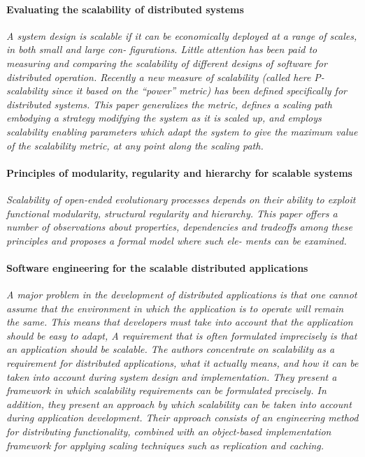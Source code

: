 \documentclass{article}
\begin{document}
\paragraph{Evaluating the scalability of distributed systems}
\cite{jogalekar2000evaluating}

\emph{A system design is scalable if it can be economically deployed at a range
of scales, in both small and large con- figurations. Little attention has been
paid to measuring and comparing the scalability of different designs of
software for distributed operation. Recently a new measure of scalability
(called here P-scalability since it based on the “power” metric) has been
defined specifically for distributed systems. This paper generalizes the
metric, defines a scaling path embodying a strategy modifying the system as it
is scaled up, and employs scalability enabling parameters which adapt the
system to give the maximum value of the scalability metric, at any point along
the scaling path.}

\paragraph{Principles of modularity, regularity and hierarchy for scalable
systems} \cite{lipson2007principles}

\emph{Scalability of open-ended evolutionary processes depends on their ability
to exploit functional modularity, structural regularity and hierarchy.  This
paper offers a number of observations about properties, dependencies and
tradeoffs among these principles and proposes a formal model where such ele-
ments can be examined.}

\paragraph{Software engineering for the scalable distributed applications}
\cite{van1998software}

\emph{A major problem in the development of distributed applications is that
one cannot assume that the environment in which the application is to operate
will remain the same. This means that developers must take into account that
the application should be easy to adapt, A requirement that is often formulated
imprecisely is that an application should be scalable. The authors concentrate
on scalability as a requirement for distributed applications, what it actually
means, and how it can be taken into account during system design and
implementation. They present a framework in which scalability requirements can
be formulated precisely. In addition, they present an approach by which
scalability can be taken into account during application development. Their
approach consists of an engineering method for distributing functionality,
combined with an object-based implementation framework for applying scaling
techniques such as replication and caching.}
\end{document}
